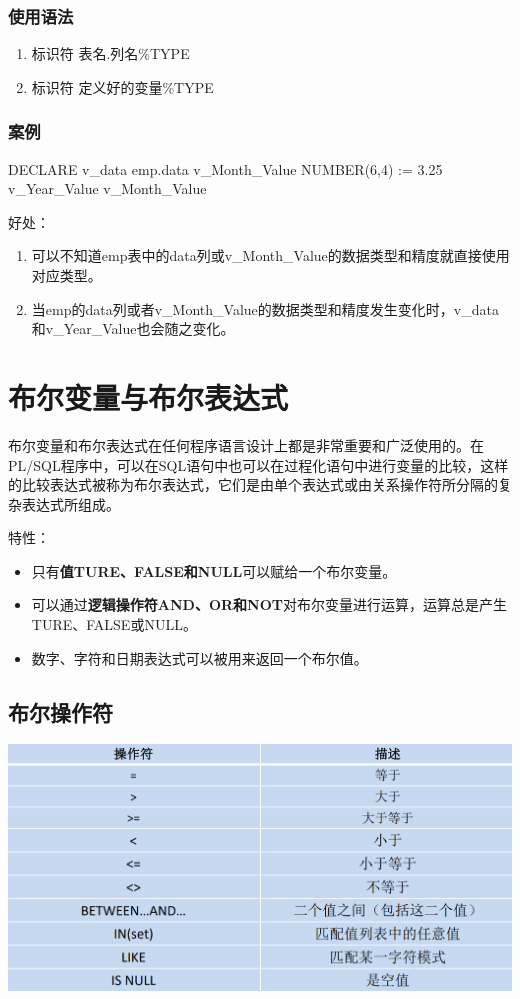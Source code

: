 \documentclass[11pt, a4paper, oneside, UTF8]{ctexbook}
\let\kaishu\relax %
\begin{document}
\subsubsection{使用语法}
\begin{enumerate}
  \item 标识符 表名.列名\%TYPE
  \item 标识符 定义好的变量\%TYPE
\end{enumerate}
\subsubsection{案例}
\begin{plsql}
DECLARE
  v_data emp.data%
  v_Month_Value NUMBER(6,4) := 3.25
  v_Year_Value v_Month_Value%
\end{plsql}
好处：
\begin{enumerate}
  \item 可以不知道emp表中的data列或v\_Month\_Value的数据类型和精度就直接使用对应类型。
  \item 当emp的data列或者v\_Month\_Value的数据类型和精度发生变化时，v\_data和v\_Year\_Value也会随之变化。
\end{enumerate}
\section{布尔变量与布尔表达式}
布尔变量和布尔表达式在任何程序语言设计上都是非常重要和广泛使用的。在PL/SQL程序中，可以在SQL语句中也可以在过程化语句中进行变量的比较，这样的比较表达式被称为布尔表达式，它们是由单个表达式或由关系操作符所分隔的复杂表达式所组成。

特性：
\begin{itemize}
  \item 只有{\bfseries\kaishu 值TURE、FALSE和NULL}可以赋给一个布尔变量。
  \item 可以通过{\bfseries\kaishu 逻辑操作符AND、OR和NOT}对布尔变量进行运算，运算总是产生TURE、FALSE或NULL。
  \item 数字、字符和日期表达式可以被用来返回一个布尔值。
\end{itemize}
\subsection{布尔操作符}
\begin{center}
  \begin{minipage}{\textwidth}
    \center
    \includegraphics[width=\textwidth]{picture/布尔操作符.png}
    \captionsetup{hypcap=false}
    \label{fig:布尔操作符}
  \end{minipage}
\end{center}
\end{document}
